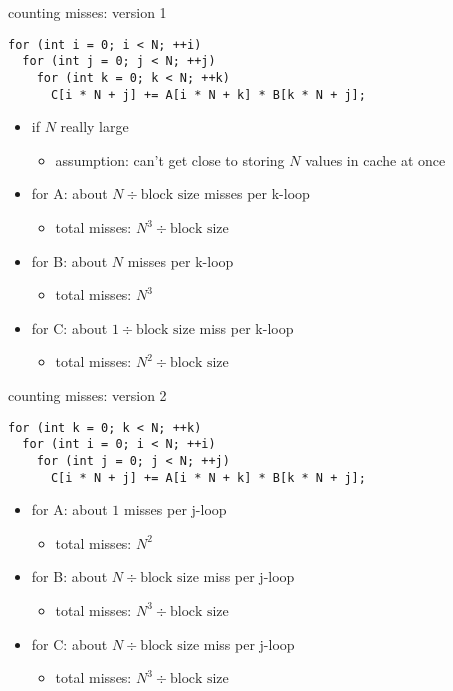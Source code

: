 \begin{frame}[fragile,label=countingMissesV1]{counting misses: version 1}
\lstset{style=smaller,language=C++}
\begin{lstlisting}
for (int i = 0; i < N; ++i)
  for (int j = 0; j < N; ++j)
    for (int k = 0; k < N; ++k)
      C[i * N + j] += A[i * N + k] * B[k * N + j];
\end{lstlisting}
\begin{itemize}
\item if $N$ really large
    \begin{itemize}
    \item assumption: can't get close to storing $N$ values in cache at once
    \end{itemize}
\item for A: about $N\div \text{block size}$ misses per k-loop
    \begin{itemize}
    \item total misses: $N^3\div\text{block size}$
    \end{itemize}
\item for B: about $N$ misses per k-loop 
    \begin{itemize}
    \item total misses: $N^3$
    \end{itemize}
\item for C: about $1\div\text{block size}$ miss per k-loop
    \begin{itemize}
    \item total misses: $N^2\div\text{block size}$
    \end{itemize}
\end{itemize}
\end{frame}

\begin{frame}[fragile,label=countingMissesV2]{counting misses: version 2}
\lstset{style=smaller,language=C++}
\begin{lstlisting}
for (int k = 0; k < N; ++k)
  for (int i = 0; i < N; ++i)
    for (int j = 0; j < N; ++j)
      C[i * N + j] += A[i * N + k] * B[k * N + j];
\end{lstlisting}
\begin{itemize}
\item for A: about $1$ misses per j-loop
    \begin{itemize}
    \item total misses: $N^2$
    \end{itemize}
\item for B: about $N\div\text{block size}$ miss per j-loop
    \begin{itemize}
    \item total misses: $N^3\div\text{block size}$
    \end{itemize}
\item for C: about $N\div\text{block size}$ miss per j-loop
    \begin{itemize}
    \item total misses: $N^3\div\text{block size}$
    \end{itemize}
\end{itemize}
\end{frame}
